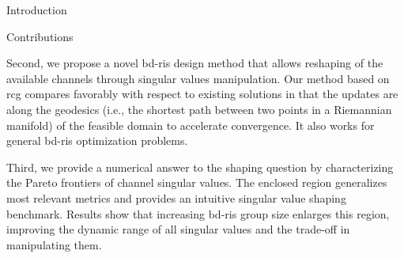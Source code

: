 \documentclass[journal]{IEEEtran}
\begin{document}
\begin{section}{Introduction}
\begin{subsection}{Contributions}

		Second, we propose a novel \gls{bd}-\gls{ris} design method that allows reshaping of the available channels through singular values manipulation.
		Our method based on \gls{rcg} compares favorably with respect to existing solutions in that the updates are along the geodesics (i.e., the shortest path between two points in a Riemannian manifold) of the feasible domain to accelerate convergence.
		It also works for general \gls{bd}-\gls{ris} optimization problems.



		Third, we provide a numerical answer to the shaping question by characterizing the Pareto frontiers of channel singular values.
		The enclosed region generalizes most relevant metrics and provides an intuitive singular value shaping benchmark.
		Results show that increasing \gls{bd}-\gls{ris} group size enlarges this region, improving the dynamic range of all singular values and the trade-off in manipulating them.



\end{subsection}
\end{section}
\end{document}
